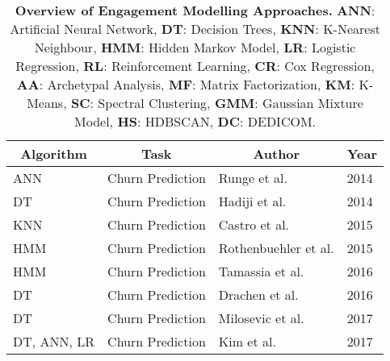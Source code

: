 \begin{table}[h]
\caption{\textbf{Overview of Engagement Modelling Approaches.} \textbf{ANN}: Artificial Neural Network, \textbf{DT}: Decision Trees, \textbf{KNN}: K-Nearest Neighbour, \textbf{HMM}: Hidden Markov Model, \textbf{LR}: Logistic Regression, \textbf{RL}: Reinforcement Learning, \textbf{CR}: Cox Regression, \textbf{AA}: Archetypal Analysis, \textbf{MF}: Matrix Factorization, \textbf{KM}: K-Means, \textbf{SC}: Spectral Clustering, \textbf{GMM}: Gaussian Mixture Model, \textbf{HS}: HDBSCAN, \textbf{DC}: DEDICOM.}
\label{eng_model_overview}
\centering
\begin{tabularx}{\textwidth}{|l|l|l|X|} 
\hline
\multicolumn{1}{|c|}{\textbf{Algorithm}} & \multicolumn{1}{c|}{\textbf{Task}} & \multicolumn{1}{c|}{\textbf{Author}}                                 & \multicolumn{1}{c|}{\textbf{Year}}  \\ 
\hline
ANN                                      & Churn Prediction                   & Runge et al. \cite{runge2014churn}                  & 2014                                \\ 
\hline
DT                                       & Churn Prediction                   & Hadiji et al. \cite{hadiji2014predicting}           & 2014                                \\ 
\hline
KNN                                      & Churn Prediction                   & Castro et al. \cite{castro2015churn}                & 2015                                \\ 
\hline
HMM                                      & Churn Prediction                   & Rothenbuehler et al. \cite{rothenbuehler2015hidden} & 2015                                \\ 
\hline
HMM                                      & Churn Prediction                   & Tamassia et al. \cite{tamassia2016predicting}       & 2016                                \\ 
\hline
DT                                       & Churn Prediction                   & Drachen et al. \cite{drachen2016rapid}              & 2016                                \\ 
\hline
DT                                       & Churn Prediction                   & Milosevic et al. \cite{milovsevic2017early}         & 2017                                \\ 
\hline
DT, ANN, LR                              & Churn Prediction                   & Kim et al. \cite{kim2017churn}                    & 2017                                \\ 

\end{tabularx}
\end{table}
